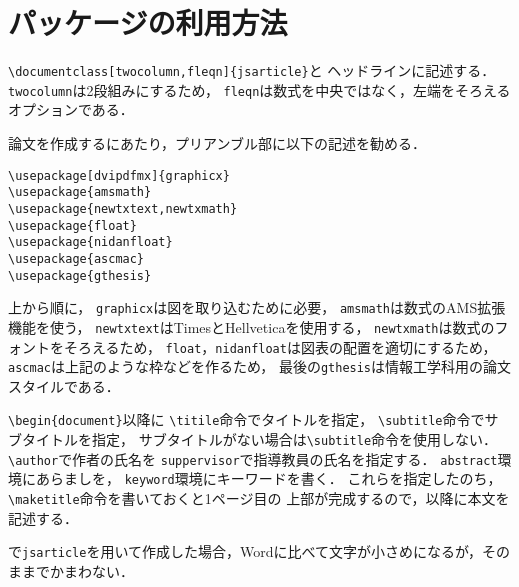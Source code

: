 \documentclass[twocolumn,fleqn]{jsarticle}
\begin{document}
\section{パッケージの利用方法}
\verb|\documentclass[twocolumn,fleqn]{jsarticle}|と
ヘッドラインに記述する．
\verb|twocolumn|は2段組みにするため，
\verb|fleqn|は数式を中央ではなく，左端をそろえるオプションである．

論文を作成するにあたり，プリアンブル部に以下の記述を勧める．
\begin{screen}
\small
\begin{verbatim}
\usepackage[dvipdfmx]{graphicx}
\usepackage{amsmath}
\usepackage{newtxtext,newtxmath}
\usepackage{float}
\usepackage{nidanfloat}
\usepackage{ascmac}
\usepackage{gthesis}
\end{verbatim}
\end{screen}
上から順に，
\verb|graphicx|は図を取り込むために必要，
\verb|amsmath|は数式のAMS拡張機能を使う，
\verb|newtxtext|はTimesと\textsf{Hellvetica}を使用する，
\verb|newtxmath|は数式のフォントをそろえるため，
\verb|float|，\verb|nidanfloat|は図表の配置を適切にするため，
\verb|ascmac|は上記のような枠などを作るため，
最後の\verb|gthesis|は情報工学科用の論文スタイルである．

\verb|\begin{document}|以降に
\verb|\titile|命令でタイトルを指定，
\verb|\subtitle|命令でサブタイトルを指定，
サブタイトルがない場合は\verb|\subtitle|命令を使用しない．
\verb|\author|で作者の氏名を
\verb|suppervisor|で指導教員の氏名を指定する．
\verb|abstract|環境にあらましを，
\verb|keyword|環境にキーワードを書く．
これらを指定したのち，\verb|\maketitle|命令を書いておくと1ページ目の
上部が完成するので，以降に本文を記述する．

\pLaTeX{}で\verb|jsarticle|を用いて作成した場合，Wordに比べて文字が小さめになるが，そのままでかまわない．

\onecolumn
\tableofcontents
\listoffigures
\listoftables
\end{document}
